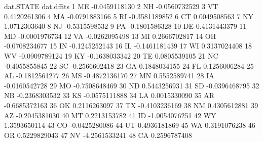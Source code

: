 \begin{Schunk}
\begin{Soutput}
   dat.STATE    dat.dffits
1         ME -0.0459118130
2         NH -0.0560732529
3         VT  0.4120261306
4         MA -0.0791883166
5         RI -0.3581189852
6         CT  0.0049508563
7         NY  1.0712303640
8         NJ -0.5315598532
9         PA -0.1801586328
10        DE  0.4131443379
11        MD -0.0001976734
12        VA -0.0262095498
13        MI  0.2666702817
14        OH -0.0708234677
15        IN -0.1245252143
16        IL -0.1461181439
17        WI  0.3137024408
18        WV -0.0909789124
19        KY -0.1638033342
20        TE  0.0805539105
21        NC -0.4055855845
22        SC -0.2566602418
23        GA  0.1848034155
24        FL  0.1256006284
25        AL -0.1812561277
26        MS -0.4872136170
27        MN  0.5552589741
28        IA -0.0160542728
29        MO -0.7508648469
30        ND  0.5443256931
31        SD -0.0396468795
32        NB -0.2368303532
33        KS -0.0575111888
34        LA  0.0015330090
35        AR -0.6685372163
36        OK  0.2116263097
37        TX -0.4103236169
38        NM  0.4305612881
39        AZ -0.2045381030
40        MT  0.2213153782
41        ID -1.0054076251
42        WY  1.3593650114
43        CO -0.0425280086
44        UT  0.4936181869
45        WA  0.3191076238
46        OR  0.5229829043
47        NV -4.2561533241
48        CA  0.2596787408
\end{Soutput}
\end{Schunk}
